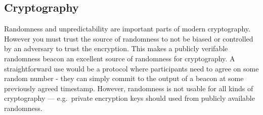 \subsection{Cryptography}\label{subsec:usecase_cryptography}
Randomness and unpredictability are important parts of modern cryptography. 
 However you must trust the source of randomness to not be biased or controlled by an adversary to trust the encryption. This makes a publicly verifable randomness beacon an excellent source of randomness for cryptography. A straightforward use would be a protocol where participants need to agree on some random number - they can simply commit to the output of a beacon at some previously agreed timestamp. 
However, randomness is not usable for all kinds of cryptography --- e.g.\ private encryption keys should used from publicly available randomness. 
